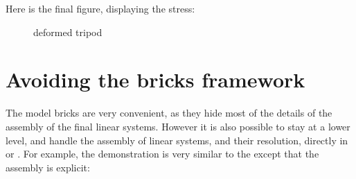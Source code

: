 \documentclass[a4paper,11pt,english]{sphinxmanual}
\begin{document}
\begin{sphinxVerbatim}[commandchars=\\\{\}]
\PYG{p}{[} \PYG{p}{]}
  

\end{sphinxVerbatim}

Here is the final figure, displaying the  stress:

\begin{figure}[htbp]
\centering
\capstart

\noindent{}
\caption{deformed tripod}\label{\detokenize{matlab_octave/examples:id1}}\label{\detokenize{matlab_octave/examples:malb-fig-tripod-vm}}\end{figure}


\section{Avoiding the bricks framework}
\label{\detokenize{matlab_octave/examples:avoiding-the-bricks-framework}}
The model bricks are very convenient, as they hide most of the details of the
assembly of the final linear systems. However it is also possible to stay at a
lower level, and handle the assembly of linear systems, and their resolution,
directly in  or . For example, the demonstration  is
very similar to the  except that the assembly is explicit:
\end{document}
